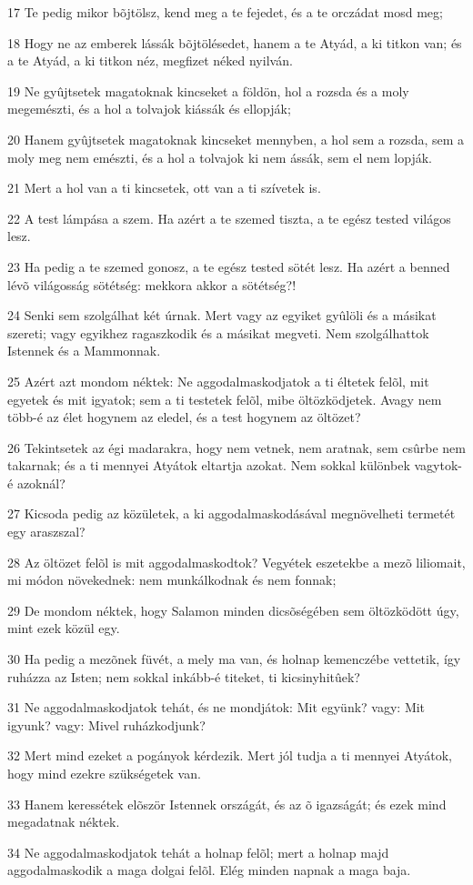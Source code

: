 \par 17 Te pedig mikor bõjtölsz, kend meg a te fejedet, és a te orczádat mosd meg;
\par 18 Hogy ne az emberek lássák bõjtölésedet, hanem a te Atyád, a ki titkon van; és a te Atyád, a ki titkon néz, megfizet néked nyilván.
\par 19 Ne gyûjtsetek magatoknak kincseket a földön, hol a rozsda és a moly megemészti, és a hol a tolvajok kiássák és ellopják;
\par 20 Hanem gyûjtsetek magatoknak kincseket mennyben, a hol sem a rozsda, sem a moly meg nem emészti, és a hol a tolvajok ki nem ássák, sem el nem lopják.
\par 21 Mert a hol van a ti kincsetek, ott van a ti szívetek is.
\par 22 A test lámpása a szem. Ha azért a te szemed tiszta, a te egész tested világos lesz.
\par 23 Ha pedig a te szemed gonosz, a te egész tested sötét lesz. Ha azért a benned lévõ világosság sötétség: mekkora akkor a sötétség?!
\par 24 Senki sem szolgálhat két úrnak. Mert vagy az egyiket gyûlöli és a másikat szereti; vagy egyikhez ragaszkodik és a másikat megveti. Nem szolgálhattok Istennek és a Mammonnak.
\par 25 Azért azt mondom néktek: Ne aggodalmaskodjatok a ti éltetek felõl, mit egyetek és mit igyatok; sem a ti testetek felõl, mibe öltözködjetek. Avagy nem több-é az élet hogynem az eledel, és a test hogynem az öltözet?
\par 26 Tekintsetek az égi madarakra, hogy nem vetnek, nem aratnak, sem csûrbe nem takarnak; és a ti mennyei Atyátok eltartja azokat. Nem sokkal különbek vagytok-é azoknál?
\par 27 Kicsoda pedig az közületek, a ki aggodalmaskodásával megnövelheti termetét egy araszszal?
\par 28 Az öltözet felõl is mit aggodalmaskodtok? Vegyétek eszetekbe a mezõ liliomait, mi módon növekednek: nem munkálkodnak és nem fonnak;
\par 29 De mondom néktek, hogy Salamon minden dicsõségében sem öltözködött úgy, mint ezek közül egy.
\par 30 Ha pedig a mezõnek füvét, a mely ma van, és holnap kemenczébe vettetik, így ruházza az Isten; nem sokkal inkább-é titeket, ti kicsinyhitûek?
\par 31 Ne aggodalmaskodjatok tehát, és ne mondjátok: Mit együnk? vagy: Mit igyunk? vagy: Mivel ruházkodjunk?
\par 32 Mert mind ezeket a pogányok kérdezik. Mert jól tudja a ti mennyei Atyátok, hogy mind ezekre szükségetek van.
\par 33 Hanem keressétek elõször Istennek országát, és az õ igazságát;  és ezek mind megadatnak néktek.
\par 34 Ne aggodalmaskodjatok tehát a holnap felõl; mert a holnap majd aggodalmaskodik a maga dolgai felõl. Elég minden napnak a maga baja.


